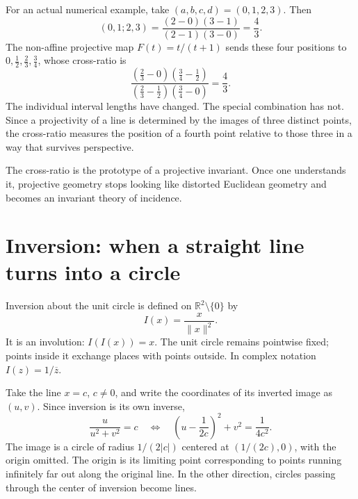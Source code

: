 For an actual numerical example, take $(a,b,c,d)=(0,1,2,3)$. Then
\[
 (0,1;2,3)=\frac{(2-0)(3-1)}{(2-1)(3-0)}=\frac43.
\]
The non-affine projective map $F(t)=t/(t+1)$ sends these four positions to $0,\frac12,\frac23,\frac34$, whose cross-ratio is
\[
 \frac{(\frac23-0)(\frac34-\frac12)}
 {(\frac23-\frac12)(\frac34-0)}
 =\frac43.
\]
The individual interval lengths have changed. The special combination has not. Since a projectivity of a line is determined by the images of three distinct points, the cross-ratio measures the position of a fourth point relative to those three in a way that survives perspective.

\begin{remark}
The cross-ratio is the prototype of a projective invariant.  Once one understands it, projective geometry stops looking like distorted Euclidean geometry and becomes an invariant theory of incidence.
\end{remark}

\section{Inversion: when a straight line turns into a circle}

Inversion about the unit circle is defined on $\mathbb R^2\setminus\{0\}$ by
\[
 I(x)=\frac{x}{\|x\|^2}.
\]
It is an involution: $I(I(x))=x$. The unit circle remains pointwise fixed; points inside it exchange places with points outside. In complex notation $I(z)=1/\overline z$.

Take the line $x=c$, $c\ne0$, and write the coordinates of its inverted image as $(u,v)$. Since inversion is its own inverse,
\[
 \frac{u}{u^2+v^2}=c
 \quad\Longleftrightarrow\quad
 \boxed{\left(u-\frac1{2c}\right)^2+v^2=\frac1{4c^2}.}
\]
The image is a circle of radius $1/(2|c|)$ centered at $(1/(2c),0)$, with the origin omitted. The origin is its limiting point corresponding to points running infinitely far out along the original line. In the other direction, circles passing through the center of inversion become lines.

